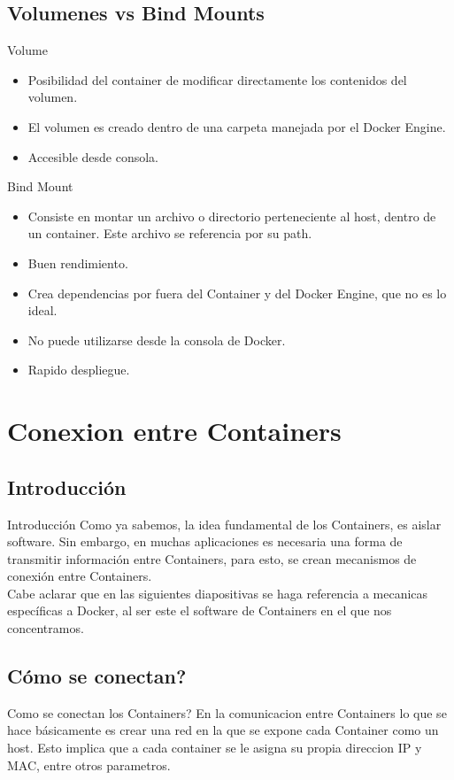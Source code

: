 \documentclass{beamer}
\begin{document}
\subsection{Volumenes vs Bind Mounts}

\begin{frame}
	Volume
	\begin{itemize}
		\item
		Posibilidad del container de modificar directamente los contenidos del volumen.
		\item
		El volumen es creado dentro de una carpeta manejada por el Docker Engine.
		\item
		Accesible desde consola.
	\end{itemize}
	Bind Mount
	\begin{itemize}
		\item
		Consiste en montar un archivo o directorio perteneciente al host, dentro de un container. Este archivo se referencia por su path.
		\item
		Buen rendimiento.
		\item
		Crea dependencias por fuera del Container y del Docker Engine, que no es lo ideal.
		\item
		No puede utilizarse desde la consola de Docker.
		\item
		Rapido despliegue.
	\end{itemize}
\end{frame}

\section{Conexion entre Containers}

\subsection{Introducción}

\begin{frame}{Introducción}
	Como ya sabemos, la idea fundamental de los Containers, es aislar software. Sin embargo, en muchas aplicaciones es necesaria una forma de transmitir información entre Containers, para esto, se crean mecanismos de conexión entre Containers. \\Cabe aclarar que en las siguientes diapositivas se haga referencia a mecanicas específicas a Docker, al ser este el software de Containers en el que nos concentramos.
\end{frame}

\subsection{Cómo se conectan?}
\begin{frame}{Como se conectan los Containers?}
	En la comunicacion entre Containers lo que se hace básicamente es crear una red en la que se expone cada Container como un host. Esto implica que a cada container se le asigna su propia direccion IP y MAC, entre otros parametros.
\end{frame}
\end{document}
